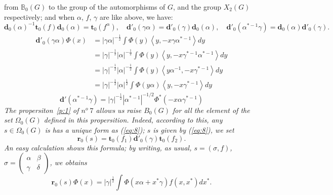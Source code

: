 \documentclass[12pt]{amsart}
\newenvironment{expl}{\it}{\color{black}\normalsize}
\def\bB{{\mathbb{B}}}
\def\bd{{\mathbf{d}}}
\def\bt{{\mathbf{t}}}
\def\br{{\mathbf{r}}}
\def\inn#1#2{\left\langle{#1},{#2}\right\rangle}
\def\abs#1{\left|{#1}\right|}
\begin{document}
from $\bB_0(G)$ to the group of the automorphisms of $G$, and the group
$X_2(G)$ respectively; and when $\alpha$, $f$, $\gamma$ are like above,
we have:
\[
\bd_0(\alpha)^{-1}\bt_0(f)\bd_0(\alpha) = \bt_0(f^\alpha),\quad
\bd'_0(\gamma \alpha) = \bd'_0(\gamma)\bd_0(\alpha),\quad
\bd'_0(\alpha^{*-1}\gamma) = \bd_0(\alpha)\bd'_0(\gamma).
\]
\begin{expl}
\[
\begin{split}
\bd'_0(\gamma\alpha)\Phi(x)
&= \abs{\gamma \alpha}^{-\frac{1}{2}} \int \Phi(y) \inn{y}{-x{\gamma\alpha}^{*-1}}dy \\
&= \abs{\gamma}^{-\frac{1}{2}} \abs{\alpha}^{-\frac{1}{2}} \int \Phi(y) 
\inn{y}{-x\gamma^{*-1}\alpha^{*-1}}dy \\
&= \abs{\gamma}^{-\frac{1}{2}} \abs{\alpha}^{-\frac{1}{2}} \int \Phi(y) 
\inn{y\alpha^{-1}}{-x\gamma^{*-1}}dy \\
&= \abs{\gamma}^{-\frac{1}{2}} \abs{\alpha}^{\frac{1}{2}} \int \Phi(y\alpha) 
\inn{y}{-x\gamma^{*-1}}dy
\end{split}
\]
\[
\bd'(\alpha^{*-1}\gamma) = \abs{\gamma}^{-\frac{1}{2}} \abs{\alpha^{*-1}}^{-1/2} 
\Phi^*(-x\alpha \gamma^{*-1})
\]
\end{expl}
The propersiton~\ref{p:1} of $n^o~7$ 
allows us raise $B_0 (G)$ for all the element of the set
$\Omega_0(G)$ defined in this propersition.
 Indeed, according to this, any $s\in \Omega_0(G)$
 is has a unique form as (\ref{eq:8}); 
 $s$ is given by (\ref{eq:8}), we set
\[
\br_0(s)=\bt_0(f_1)\bd'_0(\gamma)\bt_0(f_2).
\]
An easy calculation shows this formula;  
by writing, as usual, $s = (\sigma ,f)$,  
$\sigma = \begin{pmatrix}\alpha &\beta \\ \gamma & \delta\end{pmatrix}$,
 we obtains
\[
\br_0(s)\Phi(x) = 
\abs{\gamma}^{\frac{1}{2}}\int \Phi(x\alpha + x^*\gamma) f(x,x^*) dx^*.
\]
\end{document}
